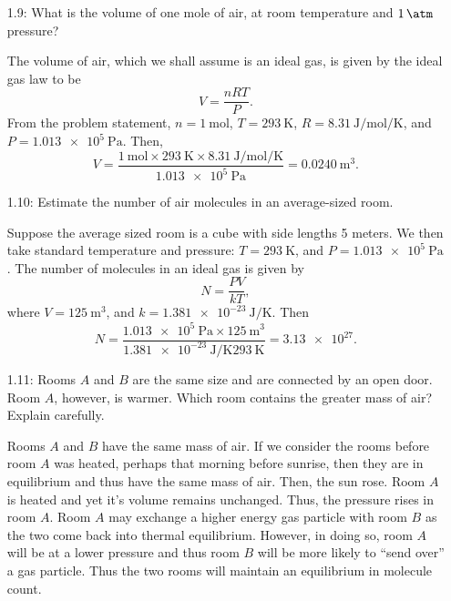 \documentclass[a4paper, 12pt]{config/homework}
\begin{document}
\begin{enumerate}
\begin{enumerate}[label=(\alph*.)]
\end{enumerate}
\pagebreak
\item[1.9:] What is the volume of one mole of air, at room temperature and \(\qty{1}{\atm}\) pressure?

The volume of air, which we shall assume is an ideal gas, is given by the ideal gas law to be
\[V = \frac{nRT}{P}.\]
From the problem statement, \(n=\qty{1}{\mol}\), \(T=\qty{293}{\kelvin}\), \(R=\qty{8.31}{\joule\per\mol\per\kelvin}\), and \(P=\qty{1.013e5}{\pascal}\). Then,
\[V = \frac{\qty{1}{\mol}\times\qty{293}{\kelvin}\times\qty{8.31}{\joule\per\mol\per\kelvin}}{\qty{1.013e5}{\pascal}}=\qty{0.0240}{\meter\cubed}.\]

\vspace{\baselineskip}
\item[1.10:] Estimate the number of air molecules in an average-sized room.

Suppose the average sized room is a cube with side lengths 5 meters. We then take standard temperature and pressure: \(T=\qty{293}{\kelvin}\), and \(P=\qty{1.013e5}{\pascal}\). The number of molecules in an ideal gas is given by
\[N = \frac{PV}{kT},\]
where \(V=\qty{125}{\meter\cubed}\), and \(k=\qty{1.381e-23}{\joule\per\kelvin}\).
Then
\[N = \frac{\qty{1.013e5}{\pascal}\times\qty{125}{\meter\cubed}}{\qty{1.381e-23}{\joule\per\kelvin}\qty{293}{\kelvin}} = \qty{3.13e27}.\]

\vspace{\baselineskip}
\item[1.11:] Rooms \(A\) and \(B\) are the same size and are connected by an open door. Room \(A\), however, is warmer. Which room contains the greater mass of air? Explain carefully.

Rooms \(A\) and \(B\) have the same mass of air. If we consider the rooms before room \(A\) was heated, perhaps that morning before sunrise, then they are in equilibrium and thus have the same mass of air. Then, the sun rose. Room \(A\) is heated and yet it's volume remains unchanged. Thus, the pressure rises in room \(A\). Room \(A\) may exchange a higher energy gas particle with room \(B\) as the two come back into thermal equilibrium. However, in doing so, room \(A\) will be at a lower pressure and thus room \(B\) will be more likely to ``send over'' a gas particle. Thus the two rooms will maintain an equilibrium in molecule count.


\end{enumerate}
\end{document}
